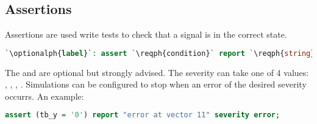 \subsection{Assertions} \label{sec:assertions}
Assertions are used write tests to check that a signal is in the correct state.
\begin{lstlisting}[language=vhdl]
`\optionalph{label}`: assert `\reqph{condition}` report `\reqph{string}` severity `\reqph{severity}`;
\end{lstlisting}
The  and  are optional but strongly advised. The
severity can take one of 4 values: , , ,
. Simulations can be configured to stop when an error of the
desired severity occurrs. An example:
\begin{lstlisting}[language=vhdl]
assert (tb_y = '0') report "error at vector 11" severity error;
\end{lstlisting}

